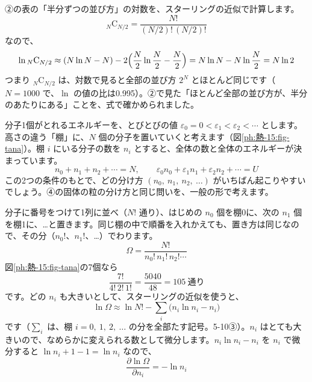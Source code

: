 ②の表の「半分ずつの並び方」の対数を、スターリングの近似で計算します。
\[{}_N\mathrm{C}_{N/2}=\frac{N!}{(N/2)!\,(N/2)!}\]
なので、
\[\ln{}_N\mathrm{C}_{N/2}\approx(N\ln N-N)-2\Bigl(\frac{N}{2}\ln\frac{N}{2}-\frac{N}{2}\Bigr)=N\ln N-N\ln\frac{N}{2}=N\ln2\]
つまり ${}_N\mathrm{C}_{N/2}$ は、対数で見ると全部の並び方 $2^N$ とほとんど同じです（$N=1000$ で、$\ln$ の値の比は0.995）。②で見た「ほとんど全部の並び方が、半分のあたりにある」ことを、式で確かめられました。

\label{ph:熱-15:sec6}
分子1個がとれるエネルギーを、とびとびの値 $\varepsilon_0=0<\varepsilon_1<\varepsilon_2<\cdots$ とします。高さの違う「棚」に、$N$ 個の分子を置いていくと考えます（図\ref{ph:熱-15:fig-tana}）。棚 $i$ にいる分子の数を $n_i$ とすると、全体の数と全体のエネルギーが決まっています。
\[n_0+n_1+n_2+\cdots=N,\qquad \varepsilon_0n_0+\varepsilon_1n_1+\varepsilon_2n_2+\cdots=U\]
この2つの条件のもとで、どの分け方 $(n_0,\ n_1,\ n_2,\ \ldots)$ がいちばん起こりやすいでしょう。④の固体の粒の分け方と同じ問いを、一般の形で考えます。

\noindent\begin{minipage}[c]{0.5\linewidth}\centering
{}
\end{minipage}\hfill
\begin{minipage}[c]{0.47\linewidth}\raggedright
{}\label{ph:熱-15:fig-tana}
\end{minipage}

分子に番号をつけて1列に並べ（$N!$ 通り）、はじめの $n_0$ 個を棚0に、次の $n_1$ 個を棚1に、…と置きます。同じ棚の中で順番を入れかえても、置き方は同じなので、その分（$n_0!$、$n_1!$、…）でわります。
\[\Omega=\frac{N!}{n_0!\,n_1!\,n_2!\cdots}\]
図\ref{ph:熱-15:fig-tana}の7個なら
\[\frac{7!}{4!\,2!\,1!}=\frac{5040}{48}=105\ \text{通り}\]
です。どの $n_i$ も大きいとして、スターリングの近似を使うと、
\[\ln\Omega\approx\ln N!-\sum_i\bigl(n_i\ln n_i-n_i\bigr)\]
です（$\sum_i$ は、棚 $i=0,\ 1,\ 2,\ \ldots$ の分を全部たす記号。5-10③）。$n_i$ はとても大きいので、なめらかに変えられる数として微分します。$n_i\ln n_i-n_i$ を $n_i$ で微分すると $\ln n_i+1-1=\ln n_i$ なので、
\[\frac{\partial\ln\Omega}{\partial n_i}=-\ln n_i\]

